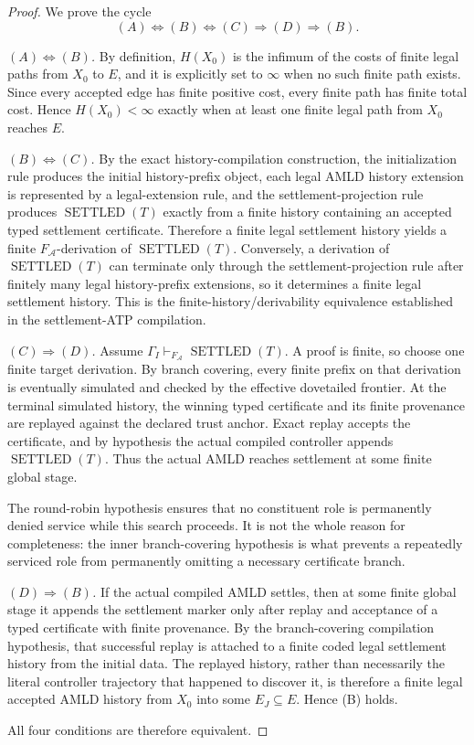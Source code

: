 \documentclass[11pt]{article}
\theoremstyle{remark}
\newcommand{\Sett}{\operatorname{SETTLED}}
\begin{document}
\begin{proof}
We prove the cycle
\[
(A)\Longleftrightarrow(B)\Longleftrightarrow(C)\Longrightarrow(D)\Longrightarrow(B).
\]

\emph{$(A)\Longleftrightarrow(B)$.}
By definition, $H(X_0)$ is the infimum of the costs of finite legal paths from $X_0$ to $E$, and it is explicitly set to $\infty$ when no such finite path exists.  Since every accepted edge has finite positive cost, every finite path has finite total cost.  Hence $H(X_0)<\infty$ exactly when at least one finite legal path from $X_0$ reaches $E$.

\emph{$(B)\Longleftrightarrow(C)$.}
By the exact history-compilation construction, the initialization rule produces the initial history-prefix object, each legal AMLD history extension is represented by a legal-extension rule, and the settlement-projection rule produces $\Sett(T)$ exactly from a finite history containing an accepted typed settlement certificate.  Therefore a finite legal settlement history yields a finite $F_{\mathcal A}$-derivation of $\Sett(T)$.  Conversely, a derivation of $\Sett(T)$ can terminate only through the settlement-projection rule after finitely many legal history-prefix extensions, so it determines a finite legal settlement history.  This is the finite-history/derivability equivalence established in the settlement-ATP compilation.

\emph{$(C)\Longrightarrow(D)$.}
Assume $\Gamma_I\vdash_{F_{\mathcal A}}\Sett(T)$.  A proof is finite, so choose one finite target derivation.  By branch covering, every finite prefix on that derivation is eventually simulated and checked by the effective dovetailed frontier.  At the terminal simulated history, the winning typed certificate and its finite provenance are replayed against the declared trust anchor.  Exact replay accepts the certificate, and by hypothesis the actual compiled controller appends $\Sett(T)$.  Thus the actual AMLD reaches settlement at some finite global stage.

The round-robin hypothesis ensures that no constituent role is permanently denied service while this search proceeds.  It is not the whole reason for completeness: the inner branch-covering hypothesis is what prevents a repeatedly serviced role from permanently omitting a necessary certificate branch.

\emph{$(D)\Longrightarrow(B)$.}
If the actual compiled AMLD settles, then at some finite global stage it appends the settlement marker only after replay and acceptance of a typed certificate with finite provenance.  By the branch-covering compilation hypothesis, that successful replay is attached to a finite coded legal settlement history from the initial data.  The replayed history, rather than necessarily the literal controller trajectory that happened to discover it, is therefore a finite legal accepted AMLD history from $X_0$ into some $E_J\subseteq E$.  Hence (B) holds.

All four conditions are therefore equivalent.
\end{proof}
\end{document}
